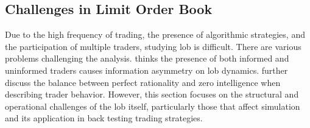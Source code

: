 \subsection{Challenges in Limit Order Book}
Due to the high frequency of trading, the presence of algorithmic strategies, and the participation of multiple traders, studying \gls{lob} is difficult. There are various problems challenging the analysis. \cite{drame2020limitorderbooklob} thinks the presence of both informed and uninformed traders causes information asymmetry on \gls{lob} dynamics. \cite{gould2013limitorderbooks} further discuss the balance between perfect rationality and zero intelligence when describing trader behavior. However, this section focuses on the structural and operational challenges of the \gls{lob} itself, particularly those that affect simulation and its application in back testing trading strategies.
